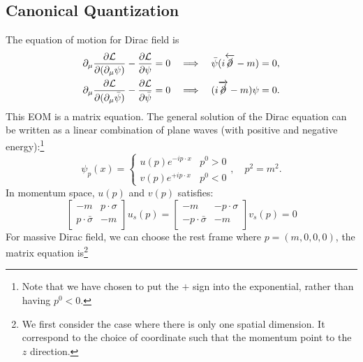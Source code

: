 \subsection{Canonical Quantization}
The equation of motion for Dirac field is
\begin{equation}
\begin{aligned}
	\partial_\mu\frac{\partial\mathcal{L}}{\partial(\partial_\mu\psi)} - \frac{\partial \mathcal L}{\partial \psi} = 0 
	\quad &\Longrightarrow \quad
	\bar\psi(i\overleftarrow{\cancel \partial}-m) = 0, \\
	\partial_\mu\frac{\partial\mathcal{L}}{\partial(\partial_\mu\bar\psi)} - \frac{\partial \mathcal L}{\partial \bar\psi} = 0 
	\quad &\Longrightarrow \quad
	(i\overrightarrow{\cancel \partial}-m)\psi = 0.
\end{aligned}
\end{equation}
This EOM is a matrix equation.
The general solution of the Dirac equation can be written as a linear combination of plane waves (with positive and negative energy):\footnote{Note that we have chosen to put the $+$ sign into the exponential, rather than having $p^{0}<0$.}
\begin{equation}
	\psi_p(x) = \begin{cases}
		u(p) e^{-i p \cdot x} & p^{0}>0 \\
		v(p) e^{+i p \cdot x} & p^{0}<0
	\end{cases}, \quad p^{2}=m^{2}.
\end{equation}
In momentum space, $u(p)$ and $v(p)$ satisfies:
\begin{equation}
	\begin{bmatrix}
		-m & p \cdot \sigma \\ p\cdot \bar\sigma & -m
	\end{bmatrix} u_s(p) = 
	\begin{bmatrix}
		-m & -p \cdot \sigma \\ -p\cdot \bar\sigma & -m
	\end{bmatrix} v_s(p) = 0
\end{equation}
For massive Dirac field, we can choose the rest frame where $p = (m,0,0,0)$, the matrix equation is\footnote{We first consider the case where there is only one spatial dimension. It correspond to the choice of coordinate such that the momentum point to the $z$ direction.}
